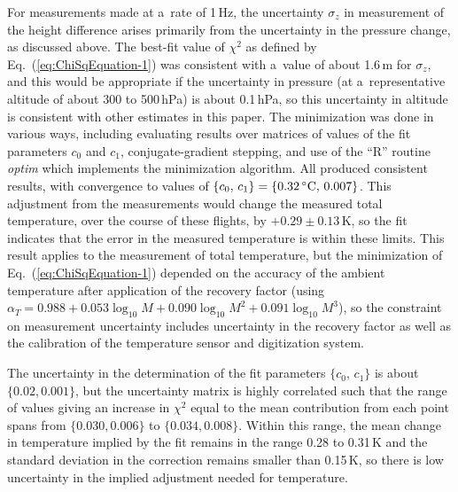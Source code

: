 \documentclass[amtd, online, hvmath]{copernicus}
\begin{document}
For measurements made at a~rate of 1\,Hz, the uncertainty $\sigma_z$
in measurement of the height difference arises primarily from the
uncertainty in the pressure change, as discussed above. The best-fit
value of $\chi^2$ as defined by Eq.~(\ref{eq:ChiSqEquation-1}) was
consistent with a~value of about 1.6\,m for $\sigma_z$, and this would
be appropriate if the uncertainty in pressure (at a~representative
altitude of about 300 to 500\,hPa) is about 0.1\,hPa, so this
uncertainty in altitude is consistent with other estimates in this
paper. The minimization was done in various ways, including evaluating
results over matrices of values of the fit parameters $c_0$ and $c_1$,
conjugate-gradient stepping, and use of the ``R'' routine
\textit{optim} \citep{Rlanguage} which implements the
\citet{NelderMead1965} minimization algorithm. All produced consistent
results, with convergence to values of
$\{c_0,\,c_1\}=\{0.32\,\unit{{\degree}C},\,0.007\}$.  This adjustment
from the measurements would change the measured total temperature,
over the course of these flights, by $+0.29\pm 0.13$\,\unit{K}, so the
fit indicates that the error in the measured temperature is within
these limits. This result applies to the measurement of total
temperature, but the minimization of Eq.~(\ref{eq:ChiSqEquation-1})
depended on the accuracy of the ambient temperature after application
of the recovery factor (using $\alpha _T = 0.988+0.053
\log_{10}M+0.090\log_{10}M^2+0.091\log_{10}M^3$), so the
\mbox{constraint} on measurement uncertainty includes uncertainty in the
recovery factor as well as the calibration of the temperature sensor
and digitization system.

The uncertainty in the determination of the fit parameters
$\{c_0,\,c_1\}$ is about $\{0.02, 0.001\}$, but the uncertainty matrix
is highly correlated such that the range of values giving an increase
in $\chi^2$ equal to the mean contribution from each point spans from
$\{0.030, 0.006\}$ to $\{0.034, 0.008\}$. Within this range, the mean
change in temperature implied by the fit remains in the range 0.28 to
0.31\,\unit{K} and the standard deviation in the correction remains
smaller than 0.15\,\unit{K}, so there is low uncertainty in the
implied adjustment needed for temperature.
\end{document}

